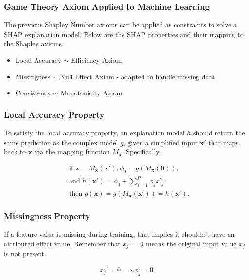 \begin{frame}\frametitle{Game Theory Axiom Applied to Machine Learning}
The previous Shapley Number axioms can be applied as constraints to solve a SHAP explanation model. Below are the SHAP properties and their mapping to the Shapley axioms.
	\bigskip
\begin{itemize}
	\item Local Accuracy $\sim$ Efficiency Axiom
	\bigskip
	\item Missingness $\sim$ Null Effect Axiom - adapted to handle missing data
	\bigskip
	\item Consistency  $\sim$ Monotonicity Axiom

\end{itemize}


\end{frame}


\begin{frame}\frametitle{Local Accuracy Property}
To satisfy the local accuracy property, an explanation model $h$ should return the same prediction as the complex model $g$, given a simplified input $\mathbf{x'}$ that maps back to $\mathbf{x}$ via the mapping function $M_\mathbf{x}$. Specifically, 

	\begin{equation}
	\begin{aligned}		
		&\text{if } \mathbf{x} = M_\mathbf{x}(\mathbf{x'}), \phi_0 = g(M_\mathbf{x}(\mathbf{0})),\\
		&\text{and } h(\mathbf{x'})= \phi_0 + \sum_{j=1}^P \phi_j x'_j,\\
		&\text{then } g(\mathbf{x}) = g(M_\mathbf{x}(\mathbf{x'})) = h(\mathbf{x'}).
	\end{aligned}
	\end{equation}


\end{frame}


\begin{frame}\frametitle{Missingness Property}
If a feature value is missing during training, that implies it shouldn't have an attributed effect value. Remember that $x_j' = 0$ means the original input value $x_j$ is not present. 
 
	\begin{equation}
	\begin{aligned}	
		x_j' = 0 \implies \phi_j = 0
	\end{aligned}
	\end{equation}
	
\end{frame}

